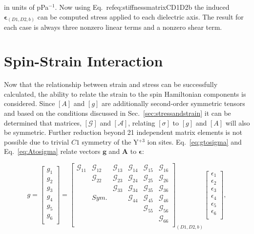 in units of pPa$^{-1}$. Now using Eq.~ref{eq:stiffnessmatrixCD1D2b} the induced $\bm{\epsilon}_{(D1,D2,b)}$ can be computed stress applied to each dielectric axis. The result for each case is always three nonzero linear terms and a nonzero shear term.   


\section{Spin-Strain Interaction}
Now that the relationship between strain and stress can be successfully calculated, the ability to relate the strain to the spin Hamiltonian components is considered. Since $[A]$ and $[g]$ are additionally second-order symmetric tensors and based on the conditions discussed in Sec.~\ref{sec:stressandstrain} it can be determined that matrices, $[\mathcal{G}]$ and $[\mathcal{A}]$, relating $[\sigma]$ to $[g]$ and $[A]$ will also be symmetric. Further reduction beyond 21 independent matrix elements is not possible due to trivial $C1$ symmetry of the Y$^{+3}$ ion sites. Eq.~\ref{eq:gtosigma} and Eq.~\ref{eq:Atosigma} relate vectors $\bm{g}$ and $\bm{A}$ to $\bm{\epsilon}$:



\begin{equation}
\label{eq:gtosigma}
g=\begin{bmatrix}
g_{1} \\
g_{2} \\
g_{3} \\
g_{4} \\
g_{5} \\
g_{6} \\
\end{bmatrix}=
\begin{bmatrix}
\mathcal{G}_{11} & \mathcal{G}_{12} & \mathcal{G}_{13} & \mathcal{G}_{14}
& \mathcal{G}_{15} & \mathcal{G}_{16} \\
& \mathcal{G}_{22} & \mathcal{G}_{23} & \mathcal{G}_{24} & \mathcal{G}_{25} & \mathcal{G}_{26} \\
& & \mathcal{G}_{33} & \mathcal{G}_{34} & \mathcal{G}_{35} & \mathcal{G}_{36} \\
& Sym. & & \mathcal{G}_{44} & \mathcal{G}_{45} & \mathcal{G}_{46} \\
& & & & \mathcal{G}_{55} & \mathcal{G}_{56} \\
& & & & & \mathcal{G}_{66} \\
\end{bmatrix}_{(D1,D2,b)}
\begin{bmatrix}
\epsilon_{1} \\
\epsilon_{2} \\
\epsilon_{3} \\
\epsilon_{4} \\
\epsilon_{5} \\
\epsilon_{6} \\
\end{bmatrix},
\end{equation}  

